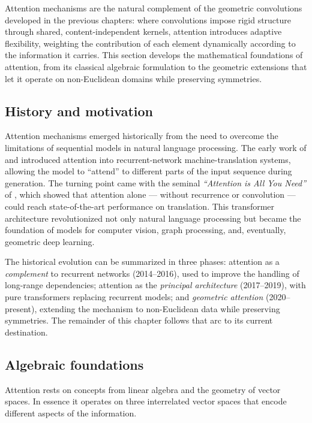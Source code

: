 Attention mechanisms are the natural complement of the geometric convolutions
developed in the previous chapters: where convolutions impose rigid structure
through shared, content-independent kernels, attention introduces adaptive
flexibility, weighting the contribution of each element dynamically according to
the information it carries. This section develops the mathematical foundations
of attention, from its classical algebraic formulation to the geometric
extensions that let it operate on non-Euclidean domains while preserving
symmetries.

\subsection{History and motivation}
\label{subsec:apps:attn-history}

Attention mechanisms emerged historically from the need to overcome the
limitations of sequential models in natural language processing. The early work
of \citet{bahdanau2014neural} and \citet{luong2015effective} introduced
attention into recurrent-network machine-translation systems, allowing the model
to ``attend'' to different parts of the input sequence during generation. The
turning point came with the seminal \emph{``Attention is All You Need''} of
\citet{vaswani2017attentionneed}, which showed that attention alone --- without
recurrence or convolution --- could reach state-of-the-art performance on
translation. This transformer architecture revolutionized not only natural
language processing but became the foundation of models for computer vision,
graph processing, and, eventually, geometric deep learning.

The historical evolution can be summarized in three phases: attention as a
\emph{complement} to recurrent networks (2014--2016), used to improve the
handling of long-range dependencies; attention as the \emph{principal
architecture} (2017--2019), with pure transformers replacing recurrent models;
and \emph{geometric attention} (2020--present), extending the mechanism to
non-Euclidean data while preserving symmetries. The remainder of this chapter
follows that arc to its current destination.

\subsection{Algebraic foundations}
\label{subsec:apps:attn-algebra}

Attention rests on concepts from linear algebra and the geometry of vector
spaces. In essence it operates on three interrelated vector spaces that encode
different aspects of the information.

